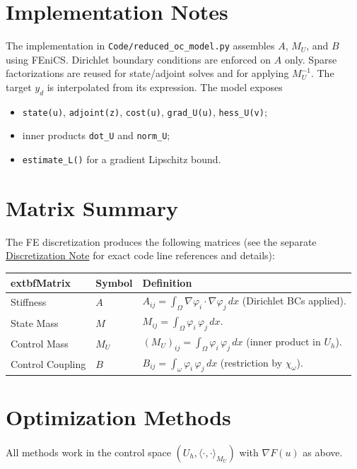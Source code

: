 \documentclass[11pt,a4paper]{article}
\begin{document}
\section{Implementation Notes}
The implementation in \texttt{Code/reduced\_oc\_model.py} assembles $A$, $M_U$, and $B$ using FEniCS. Dirichlet boundary conditions are enforced on $A$ only. Sparse factorizations are reused for state/adjoint solves and for applying $M_U^{-1}$. The target $y_d$ is interpolated from its expression. The model exposes
\begin{itemize}
  \item \texttt{state(u)}, \texttt{adjoint(z)}, \texttt{cost(u)}, \texttt{grad\_U(u)}, \texttt{hess\_U(v)};
  \item inner products \texttt{dot\_U} and \texttt{norm\_U};
  \item \texttt{estimate\_L()} for a gradient Lipschitz bound.
\end{itemize}

\section{Matrix Summary}
The FE discretization produces the following matrices (see the separate \href{run:report\_discretization.pdf}{Discretization Note} for exact code line references and details):
\begin{center}
\begin{tabular}{llp{}}
\hline
	extbf{Matrix} & \textbf{Symbol} & \textbf{Definition} \\
\hline
Stiffness & $A$ & $A_{ij} = \int_{\Omega} \nabla\varphi_i\!\cdot\!\nabla\varphi_j\,dx$ (Dirichlet BCs applied). \\
State Mass & $M$ & $M_{ij} = \int_{\Omega} \varphi_i\,\varphi_j\,dx$. \\
Control Mass & $M_U$ & $(M_U)_{ij} = \int_{\Omega} \varphi_i\,\varphi_j\,dx$ (inner product in $U_h$). \\
Control Coupling & $B$ & $B_{ij} = \int_{\omega} \varphi_i\,\varphi_j\,dx$ (restriction by $\chi_{\omega}$). \\
\hline
\end{tabular}
\end{center}

\section{Optimization Methods}
All methods work in the control space $(U_h,\langle\cdot,\cdot\rangle_{M_U})$ with $\nabla F(u)$ as above.
\end{document}
